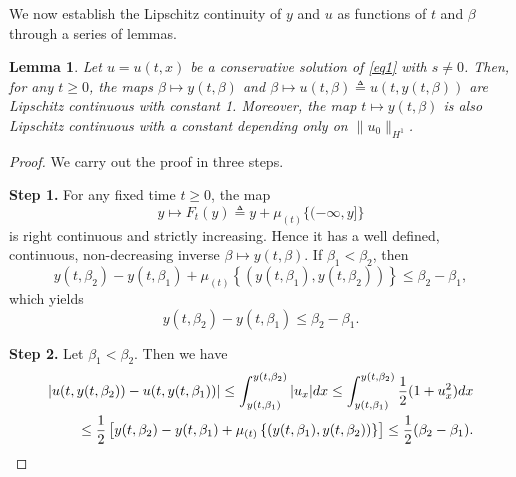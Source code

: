 \documentclass[10pt]{article}
\newtheorem{lemm}[theo]{Lemma}
\numberwithin{equation}{section}
\begin{document}
	We now establish the Lipschitz continuity of $y$ and $u$ as functions of $t$ and $\beta$ through a series of lemmas.
	\begin{lemm}\label{lip_3}
		Let $u=u(t,x)$ be a conservative solution of \eqref{eq1} with $s\neq0$. Then, for any $t\geq0$, the maps $\beta\mapsto y(t,\beta)$ and $\beta\mapsto u(t,\beta)\triangleq u(t,y(t,\beta))$ are Lipschitz continuous with constant 1. Moreover, the map $t\mapsto y(t,\beta)$ is also Lipschitz
		continuous with a constant depending only on $\|u_0\|_{H^1}$.
	\end{lemm}
	\begin{proof}
		We carry out the proof in three steps.
		
		\textbf{Step 1.} For any fixed time $t\geq0$, the map
		$$y\mapsto F_t(y)\triangleq y+\mu_{(t)}\{(-\infty,y]\}$$
		is right continuous and strictly increasing. Hence it has a well defined, continuous, non-decreasing inverse $\beta\mapsto y(t,\beta)$. If $\beta_1<\beta_2$, then 
		$$y(t,\beta_2)-y(t,\beta_1)+\mu_{(t)}\left\{(y(t,\beta_1),y(t,\beta_2))\right\}\leq\beta_2-\beta_1,$$
		which yields
		$$y(t,\beta_2)-y(t,\beta_1)\leq\beta_2-\beta_1.$$
		
		\textbf{Step 2.} Let $\beta_1<\beta_2$. Then we have 
		\begin{align}
			\left|u(t,y(t,\beta_{2}))-u(t,y(t,\beta_{1}))\right|\leq\int_{y(t,\beta_{1})}^{y(t,\beta_{2})}|u_{x}|dx\leq\int_{y(t,\beta_{1})}^{y(t,\beta_{2})}\frac{1}{2}(1+u_{x}^{2})dx\notag\\
			\leq\frac{1}{2}\left[y(t,\beta_{2})-y(t,\beta_{1})+\mu_{(t)}\left\{(y(t,\beta_{1}),y(t,\beta_{2}))\right\}\right]\leq\frac{1}{2}(\beta_{2}-\beta_{1}).\label{lip_u_beta}
		\end{align}
		

\end{proof}
\end{document}
